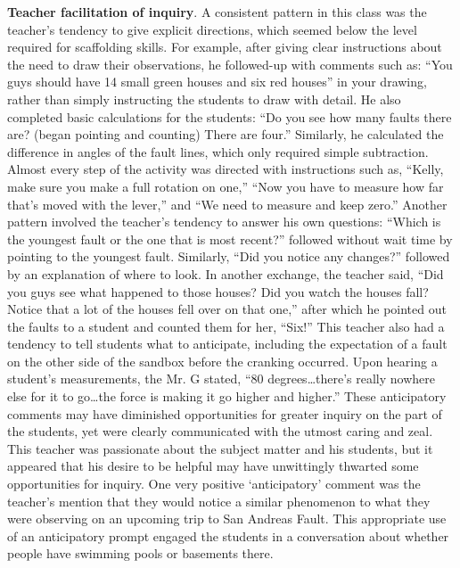 \documentclass[11.5pt]{sig-alternate} %
\begin{document}
\begin{large}
\textbf{Teacher facilitation of inquiry}. A consistent pattern in this class was the teacher’s tendency to give explicit directions, which seemed below the level required for scaffolding skills. For example, after giving clear instructions about the need to draw their observations, he followed-up with comments such as: “You guys should have 14 small green houses and six red houses” in your drawing, rather than simply instructing the students to draw with detail.  He also completed basic calculations for the students: “Do you see how many faults there are? (began pointing and counting) There are four.” Similarly, he calculated the difference in angles of the fault lines, which only required simple subtraction.  Almost every step of the activity was directed with instructions such as, “Kelly, make sure you make a full rotation on one,” “Now you have to measure how far that’s moved with the lever,” and “We need to measure and keep zero.” Another pattern involved the teacher’s tendency to answer his own questions: “Which is the youngest fault or the one that is most recent?” followed without wait time by pointing to the youngest fault. Similarly, “Did you notice any changes?” followed by an explanation of where to look.  In another exchange, the teacher said, “Did you guys see what happened to those houses? Did you watch the houses fall?  Notice that a lot of the houses fell over on that one,” after which he pointed out the faults to a student and counted them for her, “Six!”  This teacher also had a tendency to tell students what to anticipate, including the expectation of a fault on the other side of the sandbox before the cranking occurred.  Upon hearing a student’s measurements, the Mr. G stated, “80 degrees…there’s really nowhere else for it to go…the force is making it go higher and higher.” These anticipatory comments may have diminished opportunities for greater inquiry on the part of the students, yet were clearly communicated with the utmost caring and zeal.  This teacher was passionate about the subject matter and his students, but it appeared that his desire to be helpful may have unwittingly thwarted some opportunities for inquiry.  One very positive ‘anticipatory’ comment was the teacher’s mention that they would notice a similar phenomenon to what they were observing on an upcoming trip to San Andreas Fault.  This appropriate use of an anticipatory prompt engaged the students in a conversation about whether people have swimming pools or basements there.  


\end{large}
\end{document}

